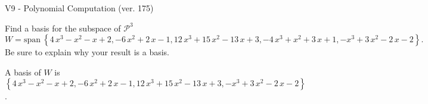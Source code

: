 \begin{exercise}
  \begin{exerciseTitle}V9 - Polynomial Computation (ver. 175)\end{exerciseTitle}
  \begin{exerciseStatement}
    Find a basis for the subspace of \(\mathcal{P}^3\) 
\[W=\mathrm{span}\ \left\{4 \, x^{3} - x^{2} - x + 2 , -6 \, x^{2} + 2 \, x - 1 , 12 \, x^{3} + 15 \, x^{2} - 13 \, x + 3 , -4 \, x^{3} + x^{2} + 3 \, x + 1 , -x^{3} + 3 \, x^{2} - 2 \, x - 2\right\}.\]
 Be sure to explain why your result is a basis.


  \end{exerciseStatement}
  \begin{exerciseAnswer}
   A basis of \(W\) is  \(\left\{4 \, x^{3} - x^{2} - x + 2 , -6 \, x^{2} + 2 \, x - 1 , 12 \, x^{3} + 15 \, x^{2} - 13 \, x + 3 , -x^{3} + 3 \, x^{2} - 2 \, x - 2\right\}\).
  


  \end{exerciseAnswer}
\end{exercise}